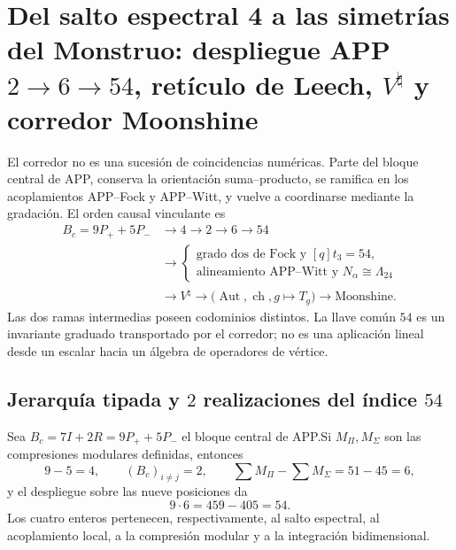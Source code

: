 \section{Del salto espectral 4 a las simetrías del Monstruo: despliegue APP
\texorpdfstring{$2\to6\to54$}{2--6--54}, retículo de Leech,
\texorpdfstring{$V^\natural$}{V natural} y corredor Moonshine}
\label{sec:cierre-equivalencias-corredor-moonshine-20260825}

El corredor no es una sucesión de coincidencias numéricas. Parte del bloque
central de APP, conserva la orientación suma--producto, se ramifica en los
acoplamientos APP--Fock y APP--Witt, y vuelve a coordinarse mediante la
gradación. El orden causal vinculante es
\[\begin{aligned}
 B_c=9P_++5P_-
 &\longrightarrow 4\longrightarrow2\longrightarrow6\longrightarrow54\\
 &\longrightarrow
 \left\{
 \begin{array}{l}
  \text{grado dos de Fock y }[q]t_3=54,\\
  \text{alineamiento APP--Witt y }N_\alpha\cong\Lambda_{24}
 \end{array}
 \right.\\
 &\longrightarrow V^\natural
 \longrightarrow
 \bigl(\operatorname{Aut},\operatorname{ch},g\mapsto T_g\bigr)
 \longrightarrow\text{Moonshine}.
\end{aligned}\]
Las dos ramas intermedias poseen codominios distintos. La llave común \(54\)
es un invariante graduado transportado por el corredor; no es una aplicación
lineal desde un escalar hacia un álgebra de operadores de vértice.

\subsection{Jerarquía tipada y \(2\) realizaciones del índice \(54\)}

\begin{theorem}
\label{thm:cierre-vtm-jerarquia-app}
Sea \(B_c=7I+2R=9P_++5P_-\) el bloque central de APP.\@ Si
\(M_\Pi,M_\Sigma\) son las compresiones modulares definidas, entonces
\[
 9-5=4,
 \qquad (B_c)_{i\ne j}=2,
 \qquad \sum M_\Pi-\sum M_\Sigma=51-45=6,
\]
y el despliegue sobre las nueve posiciones da
\[
 9\cdot6=459-405=54.
\]
Los cuatro enteros pertenecen, respectivamente, al salto espectral, al
acoplamiento local, a la compresión modular y a la integración bidimensional.
\end{theorem}

